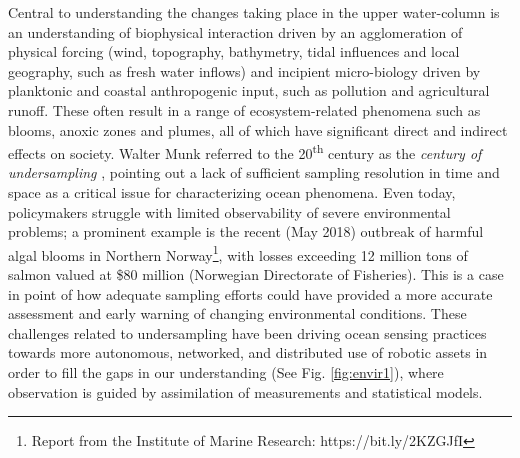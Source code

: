 \documentclass[aoas]{imsart}
\begin{document}
Central to understanding the changes taking place in the upper
water-column is an understanding of biophysical interaction driven by
an agglomeration of physical forcing (wind, topography, bathymetry,
tidal influences and local geography, such as fresh water inflows) and
incipient micro-biology driven by planktonic and coastal anthropogenic
input, such as pollution and agricultural runoff. These often result
in a range of ecosystem-related phenomena such as blooms, anoxic zones
and plumes, all of which have significant direct and indirect effects
on society. Walter Munk referred to the 20\textsuperscript{th} century
as the \emph{century of undersampling} \citep{munk2002}, pointing out
a lack of sufficient sampling resolution in time and space as a
critical issue for characterizing ocean phenomena. Even today,
policymakers struggle with limited observability of severe
environmental problems; a prominent example is the recent (May 2018)
outbreak of harmful algal blooms in Northern Norway\footnote{Report
  from the Institute of Marine Research: https://bit.ly/2KZGJfI}, with
losses exceeding 12 million tons of salmon valued at \$80 million
(Norwegian Directorate of Fisheries). This is a case in point of how
adequate sampling efforts could have provided a more accurate
assessment and early warning of changing environmental
conditions. These challenges related to undersampling have been
driving ocean sensing practices towards more autonomous, networked,
and distributed use of robotic assets in order to fill the gaps in our
understanding (See Fig. \ref{fig:envir1}), where observation is guided
by assimilation of measurements and statistical models.
\end{document}
